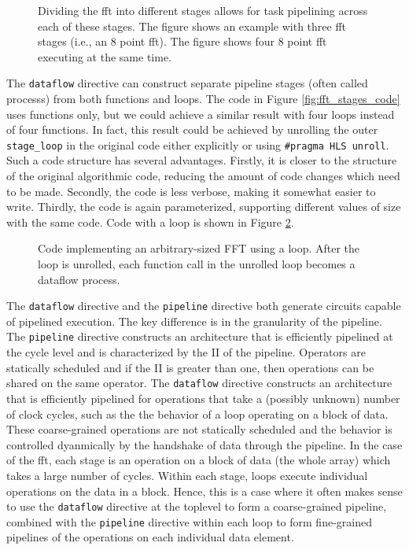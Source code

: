 \begin{figure}
\centering
{\scriptsize }

\caption{ Dividing the \gls{fft} into different stages allows for task pipelining across each of these stages. The figure shows an example with three \gls{fft} stages (i.e., an 8 point \gls{fft}). The figure shows four 8 point \gls{fft} executing at the same time. }
\label{fig:fftstages}
\end{figure}

The \lstinline|dataflow| directive can construct separate pipeline stages (often called \glspl{process}) from both functions and loops. The code in Figure \ref{fig:fft_stages_code} uses functions only, but we could achieve a similar result with four loops instead of four functions.  In fact, this result could be achieved by unrolling the outer \lstinline|stage_loop| in the original code either explicitly or using \lstinline|#pragma HLS unroll|.  Such a code structure has several advantages.  Firstly, it is closer to the structure of the original algorithmic code, reducing the amount of code changes which need to be made.   Secondly, the code is less verbose, making it somewhat easier to write.  Thirdly, the code is again parameterized, supporting different values of size with the same code.  Code with a loop is shown in Figure \ref{fig:fft_stages_loop_code}.

\begin{figure}

\caption{Code implementing an arbitrary-sized FFT using a loop. After the loop is unrolled, each function call in the unrolled loop becomes a dataflow process. }
\label{fig:fft_stages_loop_code}
\end{figure}

The \lstinline{dataflow} directive and the \lstinline{pipeline} directive both generate circuits capable of pipelined execution.  The key difference is in the granularity of the pipeline. The \lstinline{pipeline} directive constructs an architecture that is efficiently pipelined at the cycle level and is characterized by the II of the pipeline.  Operators are statically scheduled and if the II is greater than one, then operations can be shared on the same operator.  The \lstinline{dataflow} directive constructs an architecture that is efficiently pipelined for operations that take a (possibly unknown) number of clock cycles, such as the the behavior of a loop operating on a block of data.  These coarse-grained operations are not statically scheduled and the behavior is controlled dyanmically by the handshake of data through the pipeline.  In the case of the \gls{fft}, each stage is an operation on a block of data (the whole array) which takes a large number of cycles.  Within each stage, loops execute individual operations on the data in a block.  Hence, this is a case where it often makes sense to use the \lstinline|dataflow| directive at the toplevel to form a coarse-grained pipeline, combined with the \lstinline|pipeline| directive within each loop to form fine-grained pipelines of the operations on each individual data element.

